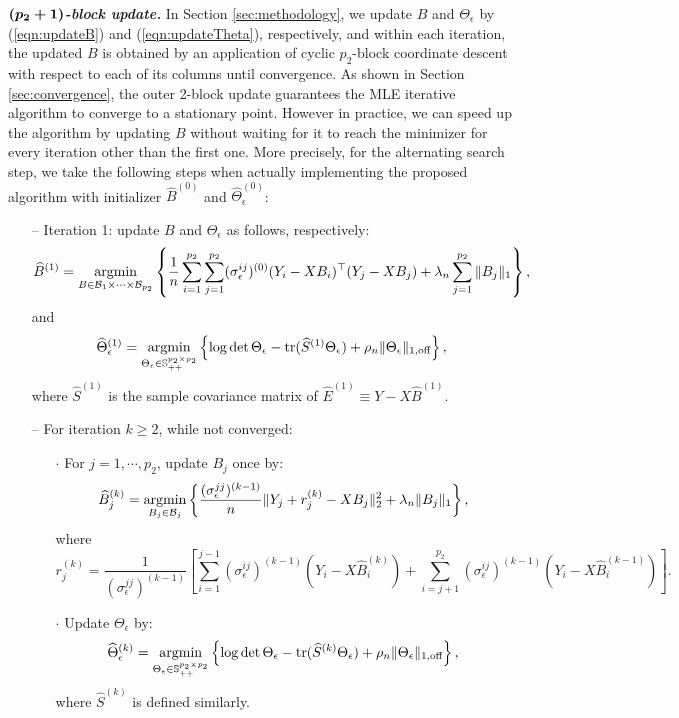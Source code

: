 \medskip
\textbf{\textit{$\boldsymbol{(p_2+1)}$-block update.}} In Section \ref{sec:methodology}, we update $B$ and $\Theta_\epsilon$ by (\ref{eqn:updateB}) and (\ref{eqn:updateTheta}), respectively, and within each iteration, the updated $B$ is obtained by an application of cyclic $p_2$-block coordinate descent with respect to each of its columns until convergence. As shown in Section \ref{sec:convergence}, the outer 2-block update guarantees the MLE iterative algorithm to converge to a stationary point. However in practice, we can speed up the algorithm by updating $B$ without waiting for it to reach the minimizer for every iteration other than the first one. More precisely, for the alternating search step, we take the following steps when actually implementing the proposed algorithm with initializer $\widehat{B}^{(0)}$ and $\widehat{\Theta}_\epsilon^{(0)}$: 
\begin{itemize}
\item[--] Iteration 1: update $B$ and $\Theta_\epsilon$ as follows, respectively:
\begin{equation*}
\widehat{B}^{(1)} = \mathop{\text{argmin}}\limits_{B\in \mathcal{B}_1\times \cdots\times \mathcal{B}_{p_2}} \left\{ \frac{1}{n}\sum_{i=1}^{p_2}\sum_{j=1}^{p_2}(\sigma_{\epsilon}^{ij})^{(0)}(Y_i-XB_i)^\top (Y_j - XB_j) + \lambda_n\sum_{j=1}^{p_2}\|B_j\|_1 \right\},
\end{equation*}
and
\begin{equation*}
 \widehat{\Theta}_\epsilon^{(1)} = \mathop{\text{argmin}}\limits_{\Theta_\epsilon\in\mathbb{S}_{++}^{p_2\times p_2}} \left\{
 \log\det\Theta_\epsilon - \text{tr}(\widehat{S}^{(1)}\Theta_\epsilon) + \rho_n\|\Theta_\epsilon\|_{1,\text{off}}
 \right\},
 \end{equation*}
where $\widehat{S}^{(1)}$ is the sample covariance matrix of $\widehat{E}^{(1)}\equiv Y- X\widehat{B}^{(1)}$. 
\item[--] For iteration $k\geq 2$, while not converged: 
\begin{itemize}
\item[$\cdot$] For $j=1,\cdots,p_2$, update $B_j$ once by:
\begin{equation*}
\widehat{B}_j^{(k)} = \mathop{\text{argmin}}\limits_{B_j\in\mathcal{B}_j} \left\{ \frac{(\sigma^{jj}_\epsilon)^{(k-1)}}{n}\|Y_j+r_j^{{(k)}}-XB_j\|_2^2 + \lambda_n\|B_j\|_1 \right\},
\end{equation*}
where 
\begin{equation}\label{eqn:updater}
r_j^{(k)} = \frac{1}{(\sigma^{jj}_\epsilon)^{(k-1)}}\left[ \sum_{i=1}^{j-1} (\sigma^{ij}_\epsilon)^{(k-1)}(Y_i-X\widehat{B}_i^{(k)}) + \sum_{i=j+1}^{p_2} (\sigma^{ij}_\epsilon)^{(k-1)} (Y_i-X\widehat{B}_i^{(k-1)})\right].
\end{equation}
\item[$\cdot$] Update $\Theta_\epsilon$ by:
\begin{equation*}
 \widehat{\Theta}_\epsilon^{(k)} = \mathop{\text{argmin}}\limits_{\Theta_\epsilon\in\mathbb{S}_{++}^{p_2\times p_2}} \left\{
 \log\det\Theta_\epsilon - \text{tr}(\widehat{S}^{(k)}\Theta_\epsilon) + \rho_n\|\Theta_\epsilon\|_{1,\text{off}}
 \right\},
 \end{equation*}
 where $\widehat{S}^{(k)}$ is defined similarly. 
\end{itemize}
\end{itemize}
